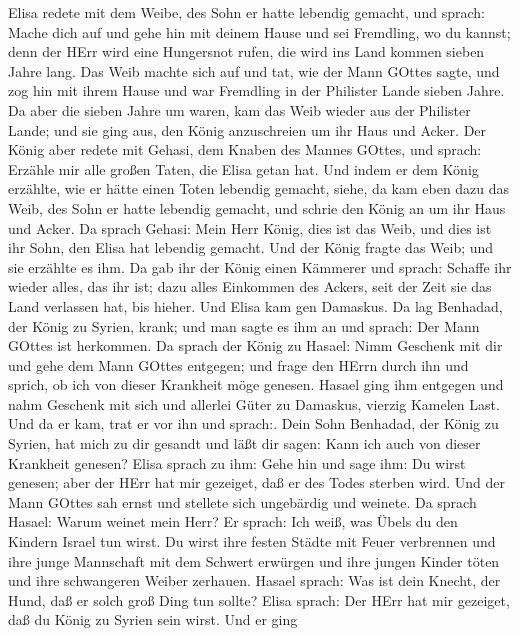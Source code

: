  Elisa redete mit dem Weibe, des Sohn er hatte lebendig
gemacht, und sprach: Mache dich auf und gehe hin mit deinem Hause und
sei Fremdling, wo du kannst; denn der HErr wird eine Hungersnot rufen,
die wird ins Land kommen sieben Jahre lang.  Das Weib machte
sich auf und tat, wie der Mann GOttes sagte, und zog hin mit ihrem Hause
und war Fremdling in der Philister Lande sieben Jahre.  Da
aber die sieben Jahre um waren, kam das Weib wieder aus der Philister
Lande; und sie ging aus, den König anzuschreien um ihr Haus und Acker.
 Der König aber redete mit Gehasi, dem Knaben des Mannes
GOttes, und sprach: Erzähle mir alle großen Taten, die Elisa getan hat.
 Und indem er dem König erzählte, wie er hätte einen Toten
lebendig gemacht, siehe, da kam eben dazu das Weib, des Sohn er hatte
lebendig gemacht, und schrie den König an um ihr Haus und Acker. Da
sprach Gehasi: Mein Herr König, dies ist das Weib, und dies ist ihr
Sohn, den Elisa hat lebendig gemacht.  Und der König fragte
das Weib; und sie erzählte es ihm. Da gab ihr der König einen Kämmerer
und sprach: Schaffe ihr wieder alles, das ihr ist; dazu alles Einkommen
des Ackers, seit der Zeit sie das Land verlassen hat, bis hieher.
 Und Elisa kam gen Damaskus. Da lag Benhadad, der König zu
Syrien, krank; und man sagte es ihm an und sprach: Der Mann GOttes ist
herkommen.  Da sprach der König zu Hasael: Nimm Geschenk mit
dir und gehe dem Mann GOttes entgegen; und frage den HErrn durch ihn und
sprich, ob ich von dieser Krankheit möge genesen.  Hasael
ging ihm entgegen und nahm Geschenk mit sich und allerlei Güter zu
Damaskus, vierzig Kamelen Last. Und da er kam, trat er vor ihn und
sprach:. Dein Sohn Benhadad, der König zu Syrien, hat mich zu dir
gesandt und läßt dir sagen: Kann ich auch von dieser Krankheit genesen?
 Elisa sprach zu ihm: Gehe hin und sage ihm: Du wirst
genesen; aber der HErr hat mir gezeiget, daß er des Todes sterben wird.
 Und der Mann GOttes sah ernst und stellete sich ungebärdig
und weinete.  Da sprach Hasael: Warum weinet mein Herr? Er
sprach: Ich weiß, was Übels du den Kindern Israel tun wirst. Du wirst
ihre festen Städte mit Feuer verbrennen und ihre junge Mannschaft mit
dem Schwert erwürgen und ihre jungen Kinder töten und ihre schwangeren
Weiber zerhauen.  Hasael sprach: Was ist dein Knecht, der
Hund, daß er solch groß Ding tun sollte? Elisa sprach: Der HErr hat mir
gezeiget, daß du König zu Syrien sein wirst.  Und er ging
